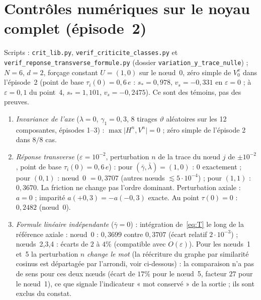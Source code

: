 \documentclass[11pt,a4paper]{article}
\theoremstyle{remark}
\newcommand{\vth}{\vartheta}
\begin{document}
\section{Contrôles numériques sur le noyau complet (épisode~2)}\label{sec:numerique}
Scripts : \texttt{crit\_lib.py}, \texttt{verif\_criticite\_classes.py} et \texttt{verif\_reponse\_transverse\allowbreak\_formule.py} (dossier \texttt{variation\_y\_trace\_nulle}) ; $N=6$, $d=2$, forçage constant $U=(1,0)$ sur le nœud~0, zéro simple de $V_0^x$ dans l'épisode~2 (point de base $\tau_i(0)=0{,}6\,e$ : $s_*=0{,}978$, $v_s=-0{,}331$ en $\varepsilon=0$ ; à $\varepsilon=0{,}1$ du point~4, $s_*=1{,}101$, $v_s=-0{,}2475$). Ce sont des témoins, pas des preuves.
\begin{enumerate}[nosep]
\item \emph{Invariance de l'axe} ($\lambda=0$, $\gamma_1=0{,}3$, 8 tirages $\vth$ aléatoires sur les 12 composantes, épisodes 1--3) : $\max\lvert H^n,V^n\rvert=0$ ; zéro simple de l'épisode 2 dans $8/8$ cas.
\item \emph{Réponse transverse} ($\varepsilon=10^{-2}$, perturbation $n$ de la trace du nœud $j$ de $\pm10^{-2}$, point de base $\tau_i(0)=0{,}6\,e$) : pour $(\bar\gamma,\bar\lambda)=(1,0)$ : $0$ exactement ; pour $(0,1)$ : nœud~0 $=0{,}3707$ (autres nœuds $\lesssim5\cdot10^{-4}$) ; pour $(1,1)$ : $0{,}3670$. La friction ne change pas l'ordre dominant. Perturbation axiale : $a=0$ ; imparité $a(+0{,}3)=-a(-0{,}3)$ exacte. Au point $\tau(0)=0$ : $0{,}2482$ (nœud~0).
\item \emph{Formule linéaire indépendante} ($\bar\gamma=0$) : intégration de~\eqref{eq:T} le long de la référence axiale : nœud~0 : $0{,}3699$ contre $0{,}3707$ (écart relatif $2\cdot10^{-3}$) ; nœuds~2,3,4 : écarts de $2$ à $4\%$ (compatible avec $O(\varepsilon)$). Pour les nœuds~1 et~5 la perturbation $n$ \emph{change le mot} (la réécriture du graphe par similarité cosinus est départagée par l'arrondi, voir ci-dessous) : la comparaison n'a pas de sens pour ces deux nœuds (écart de $17\%$ pour le nœud~5, facteur $27$ pour le nœud~1), ce que signale l'indicateur « mot conservé » de la sortie ; ils sont exclus du constat.

\end{enumerate}
\end{document}
